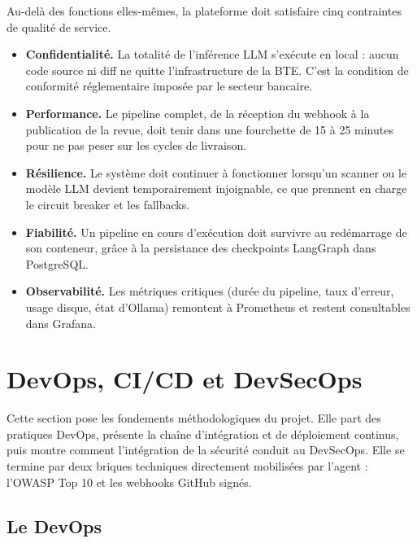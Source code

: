         Au-delà des fonctions elles-mêmes, la plateforme doit satisfaire cinq contraintes
        de qualité de service.

        \begin{itemize}
            \item \textbf{Confidentialité.} La totalité de l'inférence LLM s'exécute en
            local : aucun code source ni diff ne quitte l'infrastructure de la BTE. C'est
            la condition de conformité réglementaire imposée par le secteur bancaire.

            \item \textbf{Performance.} Le pipeline complet, de la réception du webhook à
            la publication de la revue, doit tenir dans une fourchette de 15 à 25 minutes
            pour ne pas peser sur les cycles de livraison.

            \item \textbf{Résilience.} Le système doit continuer à fonctionner lorsqu'un
            scanner ou le modèle LLM devient temporairement injoignable, ce que prennent en
            charge le circuit breaker et les fallbacks.

            \item \textbf{Fiabilité.} Un pipeline en cours d'exécution doit survivre au
            redémarrage de son conteneur, grâce à la persistance des checkpoints LangGraph
            dans PostgreSQL.

            \item \textbf{Observabilité.} Les métriques critiques (durée du pipeline, taux
            d'erreur, usage disque, état d'Ollama) remontent à Prometheus et restent
            consultables dans Grafana.
        \end{itemize}

\section{DevOps, CI/CD et DevSecOps}

    Cette section pose les fondements méthodologiques du projet. Elle part des pratiques
    DevOps, présente la chaîne d'intégration et de déploiement continus, puis montre
    comment l'intégration de la sécurité conduit au DevSecOps. Elle se termine par deux
    briques techniques directement mobilisées par l'agent : l'OWASP Top 10 et les
    webhooks GitHub signés.

    \subsection{Le DevOps}

